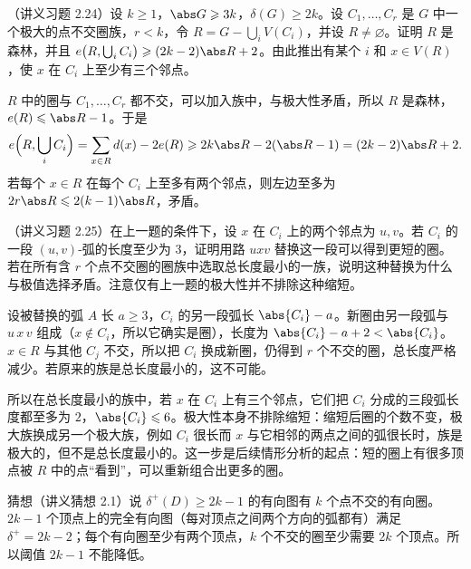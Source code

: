 \begin{workedexample}\label{we:packing:ch-step1}
（讲义习题 2.24）设 $k\geqslant1$，$\abs G\geqslant3k$，$\delta(G)\geqslant2k$。设 $C_1,\dots,C_r$ 是 $G$ 中一个极大的点不交圈族，$r<k$，令 $R=G-\bigcup_iV(C_i)$，并设 $R\neq\varnothing$。证明 $R$ 是森林，并且 $e\bigl(R,\bigcup_iC_i\bigr)\geqslant(2k-2)\abs R+2$。由此推出有某个 $i$ 和 $x\in V(R)$，使 $x$ 在 $C_i$ 上至少有三个邻点。
\end{workedexample}
\begin{solution}
$R$ 中的圈与 $C_1,\dots,C_r$ 都不交，可以加入族中，与极大性矛盾，所以 $R$ 是森林，$e(R)\leqslant\abs R-1$。于是
\[
e\Bigl(R,\bigcup_iC_i\Bigr)=\sum_{x\in R}d(x)-2e(R)\geqslant2k\abs R-2(\abs R-1)=(2k-2)\abs R+2 .
\]
若每个 $x\in R$ 在每个 $C_i$ 上至多有两个邻点，则左边至多为 $2r\abs R\leqslant2(k-1)\abs R$，矛盾。
\end{solution}

\begin{workedexample}\label{we:packing:ch-step2}
（讲义习题 2.25）在上一题的条件下，设 $x$ 在 $C_i$ 上的两个邻点为 $u,v$。若 $C_i$ 的一段 $(u,v)$-弧的长度至少为 $3$，证明用路 $uxv$ 替换这一段可以得到更短的圈。若在所有含 $r$ 个点不交圈的圈族中选取总长度最小的一族，说明这种替换为什么与极值选择矛盾。注意仅有上一题的极大性并不排除这种缩短。
\end{workedexample}
\begin{solution}
设被替换的弧 $A$ 长 $a\geqslant3$，$C_i$ 的另一段弧长 $\abs{C_i}-a$。新圈由另一段弧与 $u\,x\,v$ 组成（$x\notin C_i$，所以它确实是圈），长度为 $\abs{C_i}-a+2<\abs{C_i}$。$x\in R$ 与其他 $C_j$ 不交，所以把 $C_i$ 换成新圈，仍得到 $r$ 个不交的圈，总长度严格减少。若原来的族是总长度最小的，这不可能。

所以在总长度最小的族中，若 $x$ 在 $C_i$ 上有三个邻点，它们把 $C_i$ 分成的三段弧长度都至多为 $2$，$\abs{C_i}\leqslant6$。极大性本身不排除缩短：缩短后圈的个数不变，极大族换成另一个极大族，例如 $C_i$ 很长而 $x$ 与它相邻的两点之间的弧很长时，族是极大的，但不是总长度最小的。这一步是后续情形分析的起点：短的圈上有很多顶点被 $R$ 中的点“看到”，可以重新组合出更多的圈。
\end{solution}

\begin{remark}
猜想（讲义猜想 2.1）说 $\delta^+(D)\geqslant2k-1$ 的有向图有 $k$ 个点不交的有向圈。$2k-1$ 个顶点上的完全有向图（每对顶点之间两个方向的弧都有）满足 $\delta^+=2k-2$；每个有向圈至少有两个顶点，$k$ 个不交的圈至少需要 $2k$ 个顶点。所以阈值 $2k-1$ 不能降低。
\end{remark}

